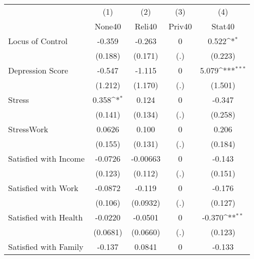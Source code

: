 {
\def\sym#1{\ifmmode^{#1}\else\(^{#1}\)\fi}
\begin{tabular}{l*{4}{c}}
\hline\hline
            &\multicolumn{1}{c}{(1)}&\multicolumn{1}{c}{(2)}&\multicolumn{1}{c}{(3)}&\multicolumn{1}{c}{(4)}\\
            &\multicolumn{1}{c}{None40}&\multicolumn{1}{c}{Reli40}&\multicolumn{1}{c}{Priv40}&\multicolumn{1}{c}{Stat40}\\
\hline
Locus of Control&      -0.359         &      -0.263         &           0         &       0.522\sym{*}  \\
            &     (0.188)         &     (0.171)         &         (.)         &     (0.223)         \\
[1em]
Depression Score&      -0.547         &      -1.115         &           0         &       5.079\sym{***}\\
            &     (1.212)         &     (1.170)         &         (.)         &     (1.501)         \\
[1em]
Stress      &       0.358\sym{*}  &       0.124         &           0         &      -0.347         \\
            &     (0.141)         &     (0.134)         &         (.)         &     (0.258)         \\
[1em]
StressWork  &      0.0626         &       0.100         &           0         &       0.206         \\
            &     (0.155)         &     (0.131)         &         (.)         &     (0.184)         \\
[1em]
Satisfied with Income&     -0.0726         &    -0.00663         &           0         &      -0.143         \\
            &     (0.123)         &     (0.112)         &         (.)         &     (0.151)         \\
[1em]
Satisfied with Work&     -0.0872         &      -0.119         &           0         &      -0.176         \\
            &     (0.106)         &    (0.0932)         &         (.)         &     (0.127)         \\
[1em]
Satisfied with Health&     -0.0220         &     -0.0501         &           0         &      -0.370\sym{**} \\
            &    (0.0681)         &    (0.0660)         &         (.)         &     (0.123)         \\
[1em]
Satisfied with Family&      -0.137         &      0.0841         &           0         &      -0.133         \\

\end{tabular}}
